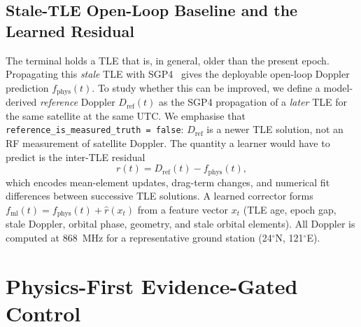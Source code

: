 \documentclass[conference]{IEEEtran}
\begin{document}
\subsection{Stale-TLE Open-Loop Baseline and the Learned Residual}
\label{sec:baseline}
The terminal holds a TLE that is, in general, older than the present epoch.
Propagating this \emph{stale} TLE with SGP4~\cite{hoots1980models} gives the
deployable open-loop Doppler prediction $f_{\mathrm{phys}}(t)$. To study whether
this can be improved, we define a model-derived \emph{reference} Doppler
$D_{\mathrm{ref}}(t)$ as the SGP4 propagation of a \emph{later} TLE for the same
satellite at the same UTC. We emphasise that
\texttt{reference\_is\_measured\_truth = false}: $D_{\mathrm{ref}}$ is a newer
TLE solution, not an RF measurement of satellite Doppler. The quantity a learner
would have to predict is the inter-TLE residual
\begin{equation}
r(t) = D_{\mathrm{ref}}(t) - f_{\mathrm{phys}}(t),
\label{eq:residual}
\end{equation}
which encodes mean-element updates, drag-term changes, and numerical fit
differences between successive TLE solutions. A learned corrector forms
$f_{\mathrm{ml}}(t)=f_{\mathrm{phys}}(t)+\hat r(x_t)$ from a feature vector $x_t$
(TLE age, epoch gap, stale Doppler, orbital phase, geometry, and stale orbital
elements). All Doppler is computed at 868~MHz for a representative ground station
(24$^\circ$N, 121$^\circ$E).

\section{Physics-First Evidence-Gated Control}
\label{sec:method}
\end{document}
